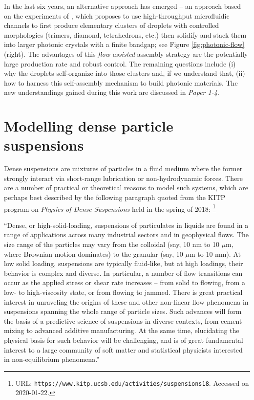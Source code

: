 In the last six years, an alternative approach has emerged -- an approach based on the experiments of \cite{tab0, Shen_AS_2016}, which proposes to use high-throughput microfluidic channels to first produce elementary clusters of droplets with controlled morphologies (trimers, diamond, tetrahedrons, etc.) then solidify and stack them into larger photonic crystals with a finite bandgap; see Figure \ref{fig:photonic-flow} (right).
The advantages of this \emph{flow-assisted} assembly strategy are the potentially large production rate and robust control.
The remaining questions include
(i) why the droplets self-organize into those clusters and, if we understand that,
(ii) how to harness this self-assembly mechanism to build photonic materials.
The new understandings gained during this work are discussed in \emph{Paper 1-4}.


\section{Modelling dense particle suspensions}

Dense suspensions are mixtures of particles in a fluid medium where the former strongly interact via short-range lubrication or non-hydrodynamic forces.
There are a number of practical or theoretical reasons to model such systems,
which are perhaps best described by the following paragraph quoted from the KITP program on \emph{Physics of Dense Suspensions} held in the spring of 2018:
\footnote{URL: \texttt{https://www.kitp.ucsb.edu/activities/suspensions18}. Accessed on 2020-01-22.}

\medskip
{\small
``Dense, or high-solid-loading, suspensions of particulates in liquids are found in a range of applications across many industrial sectors and in geophysical flows. The size range of the particles may vary from the colloidal (say, 10 nm to 10 $\mu$m, where Brownian motion dominates) to the granular (say, 10 $\mu$m to 10 mm). At low solid loading, suspensions are typically fluid-like, but at high loadings, their behavior is complex and diverse. In particular, a number of flow transitions can occur as the applied stress or shear rate increases -- from solid to flowing, from a low- to high-viscosity state, or from flowing to jammed. There is great practical interest in unraveling the origins of these and other non-linear flow phenomena in suspensions spanning the whole range of particle sizes. Such advances will form the basis of a predictive science of suspensions in diverse contexts, from cement mixing to advanced additive manufacturing. At the same time, elucidating the physical basis for such behavior will be challenging, and is of great fundamental interest to a large community of soft matter and statistical physicists interested in non-equilibrium phenomena.''}

